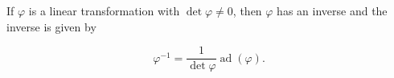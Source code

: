 If $\varphi$ is a linear transformation with $\det \varphi \neq 0$, then $\varphi$ has an inverse and the inverse is given by

$$\varphi^{-1} = \frac{1}{\det \varphi} \operatorname{ad}(\varphi).$$
